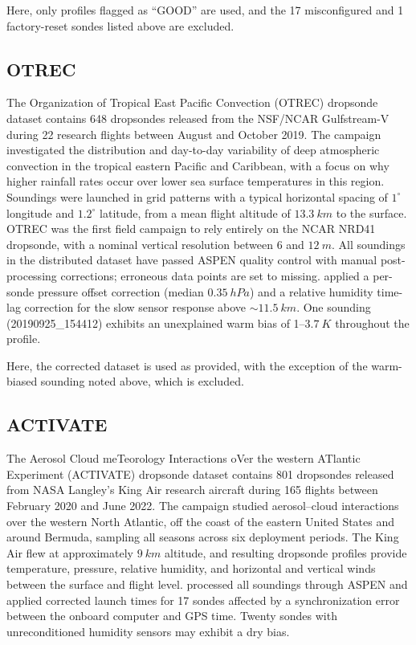 \documentclass[11pt]{article}
\begin{document}
Here, only profiles flagged as ``GOOD'' are used, and the 17 misconfigured and 1 factory-reset sondes listed above are excluded.

\subsection{OTREC}

The Organization of Tropical East Pacific Convection (OTREC) dropsonde dataset \citep{vomel2021} contains 648 dropsondes released from the NSF/NCAR Gulfstream-V during 22 research flights between August and October 2019.  The campaign investigated the distribution and day-to-day variability of deep atmospheric convection in the tropical eastern Pacific and Caribbean, with a focus on why higher rainfall rates occur over lower sea surface temperatures in this region.  Soundings were launched in grid patterns with a typical horizontal spacing of $1^\circ$ longitude and $1.2^\circ$ latitude, from a mean flight altitude of $\SI{13.3}{km}$ to the surface.  OTREC was the first field campaign to rely entirely on the NCAR NRD41 dropsonde, with a nominal vertical resolution between 6 and $\SI{12}{m}$.  All soundings in the distributed dataset have passed ASPEN quality control with manual post-processing corrections; erroneous data points are set to missing.  \citet{vomel2021} applied a per-sonde pressure offset correction (median $\SI{0.35}{hPa}$) and a relative humidity time-lag correction for the slow sensor response above ${\sim}\SI{11.5}{km}$.  One sounding (20190925\_154412) exhibits an unexplained warm bias of 1--$\SI{3.7}{K}$ throughout the profile.

Here, the corrected dataset is used as provided, with the exception of the warm-biased sounding noted above, which is excluded.

\subsection{ACTIVATE}

The Aerosol Cloud meTeorology Interactions oVer the western ATlantic Experiment (ACTIVATE) dropsonde dataset \citep{vomel2023activate} contains 801 dropsondes released from NASA Langley's King Air research aircraft during 165 flights between February 2020 and June 2022.  The campaign studied aerosol--cloud interactions over the western North Atlantic, off the coast of the eastern United States and around Bermuda, sampling all seasons across six deployment periods.  The King Air flew at approximately $\SI{9}{km}$ altitude, and resulting dropsonde profiles provide temperature, pressure, relative humidity, and horizontal and vertical winds between the surface and flight level.  \citet{vomel2023activate} processed all soundings through ASPEN and applied corrected launch times for 17 sondes affected by a synchronization error between the onboard computer and GPS time.  Twenty sondes with unreconditioned humidity sensors may exhibit a dry bias.
\end{document}
